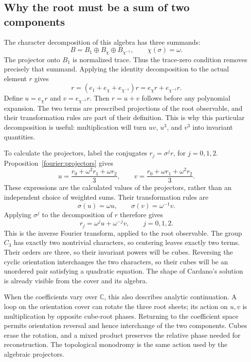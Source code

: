 \documentclass[11pt]{article}
\theoremstyle{remark}
\newcommand{\C}{\mathbb C}
\begin{document}
\subsection{Why the root must be a sum of two components}

The character decomposition of this algebra has three summands:
\[
B=B_1\oplus B_\chi\oplus B_{\chi^{-1}},
\qquad \chi(\sigma)=\omega.
\]
The projector onto \(B_1\) is normalized trace. Thus the trace-zero condition removes precisely that summand. Applying the identity decomposition to the actual element \(r\) gives
\[
r=(e_1+e_\chi+e_{\chi^{-1}})r
  =e_\chi r+e_{\chi^{-1}}r.
\]
Define \(u=e_\chi r\) and \(v=e_{\chi^{-1}}r\). Then \(r=u+v\) follows before any polynomial expansion. The two terms are prescribed projections of the root observable, and their transformation rules are part of their definition. This is why this particular decomposition is useful: multiplication will turn \(uv\), \(u^3\), and \(v^3\) into invariant quantities.

To calculate the projectors, label the conjugates \(r_j=\sigma^j r\), for \(j=0,1,2\). Proposition~\ref{fourier:projectors} gives
\begin{equation}
u=\frac{r_0+\omega^2r_1+\omega r_2}{3},
\qquad
v=\frac{r_0+\omega r_1+\omega^2r_2}{3}.
\label{eq:cubic-fourier}
\end{equation}
These expressions are the calculated values of the projectors, rather than an independent choice of weighted sums. Their transformation rules are
\[
\sigma(u)=\omega u,\qquad \sigma(v)=\omega^{-1}v.
\]
Applying \(\sigma^j\) to the decomposition of \(r\) therefore gives
\begin{equation}
r_j=\omega^ju+\omega^{-j}v,\qquad j=0,1,2.
\label{eq:cubic-inversion}
\end{equation}
This is the inverse Fourier transform, applied to the root observable. The group \(C_3\) has exactly two nontrivial characters, so centering leaves exactly two terms. Their orders are three, so their invariant powers will be cubes. Reversing the cyclic orientation interchanges the two characters, so their cubes will be an unordered pair satisfying a quadratic equation. The shape of Cardano's solution is already visible from the cover and its algebra.

When the coefficients vary over \(\C\), this also describes analytic continuation. A loop on the orientation cover can rotate the three root sheets; its action on \(u,v\) is multiplication by opposite cube-root phases. Returning to the coefficient space permits orientation reversal and hence interchange of the two components. Cubes erase the rotation, and a mixed product preserves the relative phase needed for reconstruction. The topological monodromy is the same action used by the algebraic projectors.
\end{document}
